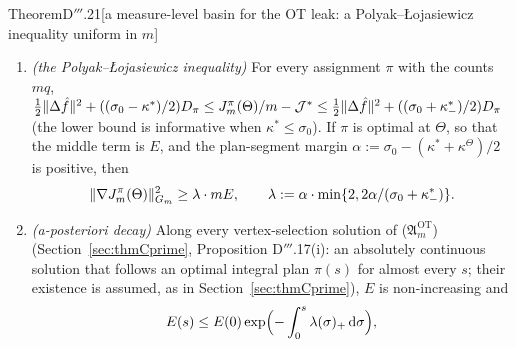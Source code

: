 \begin{thm}{Theorem}{D$'''$.21}[a measure-level basin for the OT leak: a Polyak--{\L}ojasiewicz inequality uniform
in $m$]
\begin{enumerate}[label=\textup{(\roman*)}]
\begin{align}
      \frac1m\sum_i\langle\nabla_{\vartheta_i}J^\pi_m(\Theta),u_i\rangle &= \norm{\Delta\fhat}^2 + \sigma_0D_\pi
      \notag\\
      &\quad- \frac1m\sum_i\int_0^1u_i^\T\bigl[(1 - t)R[\mu^*] + tR[\mu_\Theta]\bigr](\vartheta^*_{\pi(i)}
      + tu_i)u_i\dd t,
      \tag{P}
    \end{align}
    the norms in $L^2(\rho)$. The counts enter through
    $\Delta\fhat = (1/m)\sum_i[\tilde\Phi(\cdot\,;\vartheta_i) - \tilde\Phi(\cdot\,;\vartheta^*_{\pi(i)})]$, which
    holds because $\abs{\pi^{-1}(j)} = mq_j$, and through the constant term of the leak. \textup{(E)} holds for every
    coupling of $\mu_\Theta$ with the column masses $q$, fractional plans included ($(1/m)\sum_i$ replaced by
    $\sum_{ij}\gamma_{ij}$); \textup{(P)}, with one test direction per particle, needs an assignment. With counts
    $N\ne mq$ both acquire a defect ---
    $\sum_k(N_k/m - q_k)\bigl(-\langle r^*,\tilde\Phi(\cdot\,;\vartheta^*_k)\rangle
    + (\sigma_0/2)\norm{\vartheta^*_k - \vartheta^0_k}^2_{\Ginv}\bigr)$ in \textup{(E)} and
    $-\langle\Delta\fhat,\fhat[\mu_N] - \fhat[\mu^*]\rangle$ in \textup{(P)},
    $\mu_N := \sum_k(N_k/m)\delta_{\vartheta^*_k}$ --- and at incommensurate $m$ no PL inequality relative to
    $\mathcal{J}^*$ can hold: the stationary configurations of Proposition D$'''$.12(iv), with their bridge
    particles, are critical at a positive excess energy.
  \item \emph{(the Polyak--{\L}ojasiewicz inequality)} For every assignment $\pi$ with the counts $mq$,
    $\frac12\lVert \Delta\hat f\rVert^2 + ((\sigma_0 - \kappa^*)/2)D_\pi\le J^\pi_m(\Theta)/m - \mathcal{J}^*
    \le\frac12\lVert \Delta\hat f\rVert^2 + ((\sigma_0 + \kappa^*_-)/2)D_\pi$ (the lower bound is informative when
    $\kappa^*\le\sigma_0$). If $\pi$ is optimal at $\Theta$, so that the middle term is $E$, and the plan-segment
    margin $\alpha := \sigma_0 - (\kappa^* + \kappa^\Theta)/2$ is positive, then
    \[
      \lVert \nabla J^\pi_m(\Theta)\rVert^2_{G_m}\ge\lambda\cdot mE,\qquad
      \lambda := \alpha\cdot\min\{2, 2\alpha/(\sigma_0 + \kappa^*_-)\}.
    \]
  \item \emph{(a-posteriori decay)} Along every vertex-selection solution of
    \textup{($\mathfrak{A}_m^{\mathrm{OT}}$)} (Section~\ref{sec:thmCprime}, Proposition D$'''$.17(i): an absolutely
    continuous solution that follows an optimal integral plan $\pi(s)$ for almost every $s$; their existence is
    assumed, as in Section~\ref{sec:thmCprime}), $E$ is non-increasing and
    \[
      E(s)\le E(0)\exp\Bigl(-\int_0^s\lambda(\sigma)_+\,\mathrm{d}\sigma\Bigr),
\]
\end{enumerate}
\end{thm}
